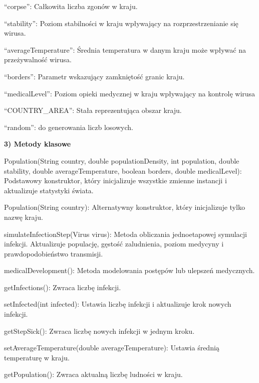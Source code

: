 \documentclass[a4paper]{article}
\begin{document}
\foreignlanguage{polish}{“corpse”: Całkowita liczba zgonów w kraju.}

\foreignlanguage{polish}{“stability”: Poziom stabilności w kraju wpływający na rozprzestrzenianie się wirusa.}

\foreignlanguage{polish}{“averageTemperature”: Średnia temperatura w danym kraju może wpływać na przeżywalność wirusa.}

\foreignlanguage{polish}{“borders”: Parametr wskazujący zamkniętość granic kraju.}

\foreignlanguage{polish}{“medicalLevel”: Poziom opieki medycznej w kraju wpływający na kontrolę wirusa}

\foreignlanguage{polish}{“COUNTRY\_AREA”: Stała reprezentująca obszar kraju.}

\foreignlanguage{polish}{“random”: do generowania liczb losowych.}


\bigskip

\foreignlanguage{polish}{\textbf{3) Metody klasowe}}

\foreignlanguage{polish}{Population(String country, double populationDensity, int population, double stability, double
averageTemperature, boolean borders, double medicalLevel): Podstawowy konstruktor, który inicjalizuje wszystkie zmienne
instancji i aktualizuje statystyki świata.}

\foreignlanguage{polish}{Population(String country): Alternatywny konstruktor, który inicjalizuje tylko nazwę kraju.}

\foreignlanguage{polish}{simulateInfectionStep(Virus virus): Metoda obliczania jednoetapowej symulacji infekcji.
Aktualizuje populację, gęstość zaludnienia, poziom medycyny i prawdopodobieństwo transmisji.}

\foreignlanguage{polish}{medicalDevelopment(): Metoda modelowania postępów lub ulepszeń medycznych.}

\foreignlanguage{polish}{getInfections(): Zwraca liczbę infekcji.}

\foreignlanguage{polish}{setInfected(int infected): Ustawia liczbę infekcji i aktualizuje krok nowych infekcji.}

\foreignlanguage{polish}{getStepSick(): Zwraca liczbę nowych infekcji w jednym kroku.}

\foreignlanguage{polish}{setAverageTemperature(double averageTemperature): Ustawia średnią temperaturę w kraju.}

\foreignlanguage{polish}{getPopulation(): Zwraca aktualną liczbę ludności w kraju.}
\end{document}
